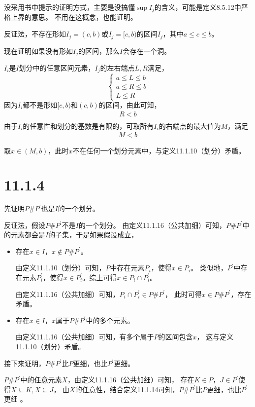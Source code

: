\documentclass{article}
\begin{document}
\begin{zremark}
  没采用书中提示的证明方式，主要是没搞懂$\sup I_j$的含义，可能是定义8.5.12中严格上界的意思。
  不用在这概念，也能证明。
\end{zremark}

反证法，不存在形如$I_{j} = (c, b)$或$I_{j} = [c, b)$的区间$I_j$，其中$a \leq c \leq b$。

现在证明如果没有形如$I_{j}$的区间，那么$I$会存在一个洞。

$I_i$是$I$划分中的任意区间元素，$I_j$的左右端点$L, R$满足，
\begin{equation*}
  \begin{cases*}
    a \leq L \leq b \\
    a \leq R \leq b \\
    L \leq R
  \end{cases*}
\end{equation*}
因为$I_i$都不是形如$[c, b)$和$(c, b)$的区间，由此可知，
\begin{align*}
  R < b \\
\end{align*}
由于$I_i$的任意性和划分的基数是有限的，可取所有$I_i$的右端点的最大值为$M$，满足
\begin{align*}
  M < b
\end{align*}

取$x \in (M, b)$，此时$x$不在任何一个划分元素中，与定义11.1.10（划分）矛盾。

\section*{11.1.4}

先证明$P \# P^\prime$也是$I$的一个划分。

反证法，假设$P \# P^\prime$不是$I$的一个划分。
由定义11.1.16（公共加细）可知，$P \# P^\prime$中的元素都会是$I$的子集，于是如果假设成立，

\begin{itemize}
  \item 存在$x \in I$，$x \notin P \# P^\prime$。

        由定义11.1.10（划分）可知，$P$中存在元素$P_i$，使得$x \in P_i$。
        类似地，$P^\prime$中存在元素$P^\prime_i$，使得$x \in P^\prime_i$。综上可得$x \in P_i \cap P^\prime_i$。

        由定义11.1.16（公共加细）可知，$P_i \cap P^\prime_i \in P \# P^\prime$，
        此时可得$x \in P \# P^\prime$，存在矛盾。

  \item 存在$x \in I$，$x$属于$P \# P^\prime$中的多个元素。

        由定义11.1.16（公共加细）可知，有多个属于$P$的区间包含$x$，
        这与定义11.1.10（划分）矛盾。
\end{itemize}


接下来证明，$P \# P^\prime$比$P$更细，也比$P^\prime$更细。

$P \# P^\prime$中的任意元素$X$，由定义11.1.16（公共加细）可知，
存在$K \in P$，$J \in P^\prime$使得$X \subseteq K, X \subseteq J$，
由$X$的任意性，结合定义11.1.14可知，$P \# P^\prime$比$P$更细，也比$P^\prime$更细 。
\end{document}
